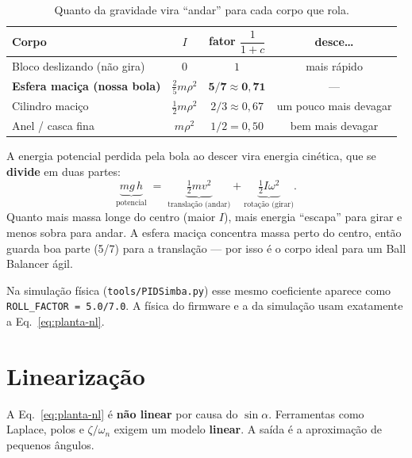 \begin{table}[h]\centering
\caption{Quanto da gravidade vira ``andar'' para cada corpo que rola.}
\label{tab:corpos}
\begin{tabular}{lccc}
\toprule
Corpo & $I$ & fator $\dfrac{1}{1+c}$ & desce\dots \\
\midrule
Bloco deslizando (n\~ao gira) & $0$ & $1$ & mais r\'apido \\
\textbf{Esfera maci\c{c}a (nossa bola)} & $\tfrac{2}{5}m\rho^2$ & $\mathbf{5/7\approx0{,}71}$ & --- \\
Cilindro maci\c{c}o & $\tfrac{1}{2}m\rho^2$ & $2/3\approx0{,}67$ & um pouco mais devagar \\
Anel / casca fina & $m\rho^2$ & $1/2=0{,}50$ & bem mais devagar \\
\bottomrule
\end{tabular}
\end{table}

\begin{intuicao}
A energia potencial perdida pela bola ao descer vira energia cin\'etica, que se
\textbf{divide} em duas partes:
\[
\underbrace{mg\,h}_{\text{potencial}} \;=\;
\underbrace{\tfrac12 m v^2}_{\text{transla\c{c}\~ao (andar)}} +
\underbrace{\tfrac12 I \omega^2}_{\text{rota\c{c}\~ao (girar)}}.
\]
Quanto mais massa longe do centro (maior $I$), mais energia ``escapa'' para girar e
menos sobra para andar. A esfera maci\c{c}a concentra massa perto do centro, ent\~ao
guarda boa parte (5/7) para a transla\c{c}\~ao --- por isso \'e o corpo ideal para um
Ball Balancer \'agil.
\end{intuicao}

\begin{projeto}
Na simula\c{c}\~ao f\'isica (\texttt{tools/PIDSimba.py}) esse mesmo coeficiente
aparece como \texttt{ROLL\_FACTOR = 5.0/7.0}. A f\'isica do firmware e a da
simula\c{c}\~ao usam exatamente a Eq.~\eqref{eq:planta-nl}.
\end{projeto}

\chapter{Lineariza\c{c}\~ao}\label{cap:linear}

A Eq.~\eqref{eq:planta-nl} \'e \textbf{n\~ao linear} por causa do $\sin\alpha$.
Ferramentas como Laplace, polos e $\zeta/\omega_n$ exigem um modelo \textbf{linear}.
A sa\'ida \'e a aproxima\c{c}\~ao de pequenos \^angulos.

